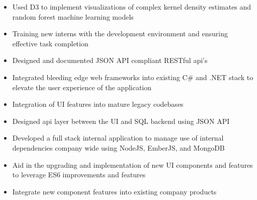 \documentclass[10pt,a4paper]{altacv}
\begin{document}
\divider

\begin{itemize}
\item Used D3 to implement visualizations of complex kernel density estimates and random forest machine learning models
\item Training new interns with the development environment and ensuring effective task completion
\item Designed and documented JSON API compliant RESTful api's
\end{itemize}

\divider

\begin{itemize}
\item Integrated bleeding edge web frameworks into existing C\# and .NET stack to elevate the user experience of the application
\item Integration of UI features into mature legacy codebases
\item Designed api layer between the UI and SQL backend using JSON API
\end{itemize}

\divider

\begin{itemize}
\item Developed a full stack internal application to manage use of internal dependencies company wide using NodeJS, EmberJS, and MongoDB
\item Aid in the upgrading and implementation of new UI components and features to leverage ES6 improvements and features
\item Integrate new component features into existing company products
\end{itemize}




\end{document}
